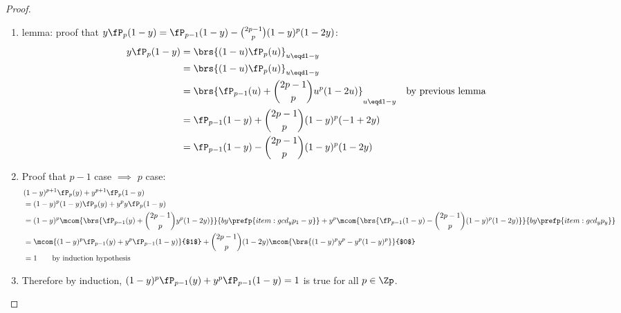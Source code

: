 \begin{proof}
\begin{enumerate}
\begin{enumerate}
\begin{enumerate}
            \item lemma: proof that $y\fP_p(1-y)=\fP_{p-1}(1-y) - {2p-1 \choose p}(1-y)^p(1-2y)$: \label{item:gcd_yp_y}
              \begin{align*}
                y\fP_p(1-y)
                  &= \brs{(1-u)\fP_p(u)}_{u\eqd 1-y}
                \\&= \brs{(1-u)\fP_p(u)}_{u\eqd 1-y}
                \\&= \brs{\fP_{p-1}(u) + {2p-1 \choose p}u^p(1-2u)}_{u\eqd 1-y}
                  && \text{by previous lemma}
                \\&= \fP_{p-1}(1-y) + {2p-1 \choose p}(1-y)^p(-1+2y)
                \\&= \fP_{p-1}(1-y) - {2p-1 \choose p}(1-y)^p(1-2y)
              \end{align*}

            \item Proof that $p-1$ case $\implies$ $p$ case:
              \begin{align*}
                &(1-y)^{p+1} \fP_{p}(y) + y^{p+1} \fP_{p}(1-y)
                \\&= (1-y)^{p}(1-y) \fP_{p}(y) + y^{p}y \fP_{p}(1-y)
                \\&= (1-y)^{p}\mcom{\brs{\fP_{p-1}(y) + {2p-1 \choose p}y^p(1-2y)}}{by \prefp{item:gcd_yp_1-y}}
                   +  y^{p}   \mcom{\brs{\fP_{p-1}(1-y) - {2p-1 \choose p}(1-y)^p(1-2y)}}{by \prefp{item:gcd_yp_y}}
                \\&= \mcom{(1-y)^{p}\fP_{p-1}(y)+y^{p}\fP_{p-1}(1-y)}{$1$}
                   + {2p-1 \choose p}(1-2y)\mcom{\brs{(1-y)^py^p -y^p(1-y)^p}}{$0$}
                \\&= 1
                  \qquad \text{by induction hypothesis}
              \end{align*}

            \item Therefore by induction,
                  $(1-y)^{p} \fP_{p-1}(y) + y^{p} \fP_{p-1}(1-y)=1$
                  is true for all $p\in\Zp$.
          \end{enumerate}


\end{enumerate}
\end{enumerate}
\end{proof}
